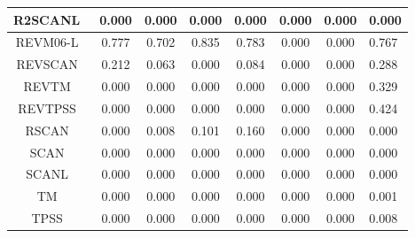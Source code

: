 \begin{tabular}{|c|c|c|c|c|c|c|l|}
R2SCANL~\cite{Mejia2020_121109,Furness2020_8208,Furness2020_9248} &                0.000 &                          0.000 &             0.000 &                        0.000 &                0.000 &                0.000 &                       0.000 \\ \hline
                                    REVM06-L~\cite{Wang2017_8487} &                0.777 &                          0.702 &             0.835 &                        0.783 &                0.000 &                0.000 &                       0.767 \\ \hline
                                    REVSCAN~\cite{Mezei2018_2469} &                0.212 &                          0.063 &             0.000 &                        0.084 &                0.000 &                0.000 &                       0.288 \\ \hline
                                       REVTM~\cite{Jana2019_6356} &                0.000 &                          0.000 &             0.000 &                        0.000 &                0.000 &                0.000 &                       0.329 \\ \hline
           REVTPSS~\cite{Perdew2009_026403,Perdew2009_026403_err} &                0.000 &                          0.000 &             0.000 &                        0.000 &                0.000 &                0.000 &                       0.424 \\ \hline
                                   RSCAN~\cite{Bartok2019_161101} &                0.000 &                          0.008 &             0.101 &                        0.160 &                0.000 &                0.000 &                       0.000 \\ \hline
                                       SCAN~\cite{Sun2015_036402} &                0.000 &                          0.000 &             0.000 &                        0.000 &                0.000 &                0.000 &                       0.000 \\ \hline
    SCANL~\cite{Mejia2017_052512,Mejia2018_115161,Sun2015_036402} &                0.000 &                          0.000 &             0.000 &                        0.000 &                0.000 &                0.000 &                       0.000 \\ \hline
                                         TM~\cite{Tao2016_073001} &                0.000 &                          0.000 &             0.000 &                        0.000 &                0.000 &                0.000 &                       0.001 \\ \hline
                       TPSS~\cite{Tao2003_146401,Perdew2004_6898} &                0.000 &                          0.000 &             0.000 &                        0.000 &                0.000 &                0.000 &                       0.008 \\ \hline
\end{tabular}